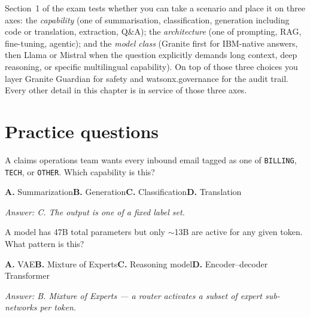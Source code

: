 \begin{takeawaybox}
Section~1 of the exam tests whether you can take a scenario and place it on three axes: the \emph{capability} (one of summarisation, classification, generation including code or translation, extraction, Q\&A); the \emph{architecture} (one of prompting, RAG, fine-tuning, agentic); and the \emph{model class} (Granite first for IBM-native answers, then Llama or Mistral when the question explicitly demands long context, deep reasoning, or specific multilingual capability). On top of those three choices you layer Granite Guardian for safety and watsonx.governance for the audit trail. Every other detail in this chapter is in service of those three axes.
\end{takeawaybox}

\section{Practice questions}

\begin{practicebox}[title=\textbf{Q1.1 --- Capability mapping}]
A claims operations team wants every inbound email tagged as one of \texttt{BILLING}, \texttt{TECH}, or \texttt{OTHER}. Which capability is this?

\textbf{A.} Summarization\hspace{1em}\textbf{B.} Generation\hspace{1em}\textbf{C.} Classification\hspace{1em}\textbf{D.} Translation

\vspace{0.2cm}\textit{Answer: C. The output is one of a fixed label set.}
\end{practicebox}

\begin{practicebox}[title=\textbf{Q1.2 --- Pattern recognition}]
A model has 47B total parameters but only $\sim$13B are active for any given token. What pattern is this?

\textbf{A.} VAE\hspace{1em}\textbf{B.} Mixture of Experts\hspace{1em}\textbf{C.} Reasoning model\hspace{1em}\textbf{D.} Encoder--decoder Transformer

\vspace{0.2cm}\textit{Answer: B. Mixture of Experts --- a router activates a subset of expert sub-networks per token.}
\end{practicebox}

